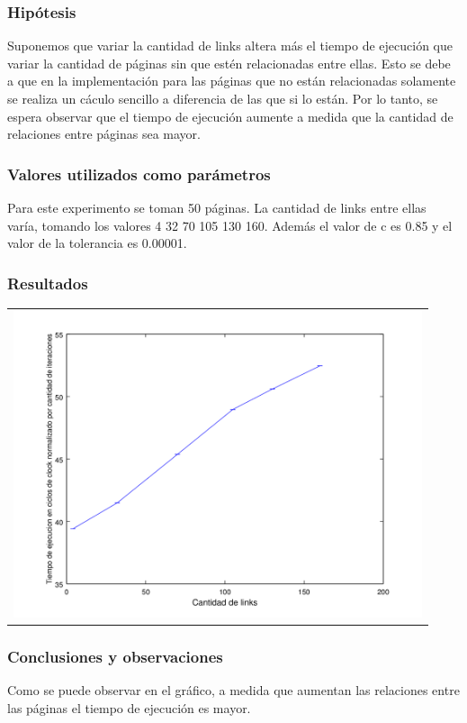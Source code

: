 		\subsubsection*{Hipótesis} 
			Suponemos que variar la cantidad de links altera más el tiempo de ejecución que variar la cantidad de páginas sin que estén relacionadas entre ellas. Esto se debe a que en la implementación para las páginas que no están relacionadas solamente se realiza un cáculo sencillo a diferencia de las que si lo están. Por lo tanto, se espera observar que el tiempo de ejecución aumente a medida que la cantidad de relaciones entre páginas sea mayor. 

		\subsubsection*{Valores utilizados como parámetros} 		
		Para este experimento se toman 50 páginas. La cantidad de links entre ellas varía, tomando los valores 4 32 70 105 130 160. Además el valor de c es 0.85 y el valor de la tolerancia es 0.00001. 
		
		\subsubsection*{Resultados}
			{\centering \begin{tabular}{c}
		      \includegraphics[width=12cm]{../../src/exp/graficos/exp2.png} \\
		    \end{tabular}}


		\subsubsection*{Conclusiones y observaciones}
		Como se puede observar en el gráfico, a medida que aumentan las relaciones entre las páginas el tiempo de ejecución es mayor.  



